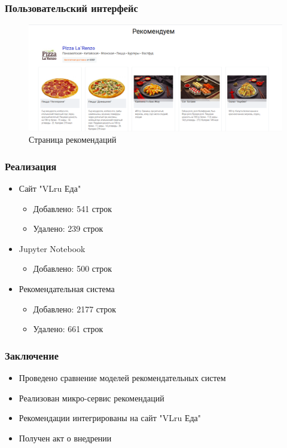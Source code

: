 \documentclass[10pt, unicode]{beamer}
\begin{document}
\begin{frame}
  \frametitle{Пользовательский интерфейс}
  \begin{adjustwidth}{-3em}{-1.5em}
    \begin{figure}[H]
      \centering
      \includegraphics[scale=0.34]{images/tag_page.png}
      \caption{Страница рекомендаций}
    \end{figure}
  \end{adjustwidth}
\end{frame}

\begin{frame}
  \frametitle{Реализация}
  \begin{itemize}
    \item Сайт "VLru Еда"
      \begin{itemize}
        \item Добавлено: 541 строк
        \item Удалено: 239 строк
      \end{itemize}
    \item Jupyter Notebook
      \begin{itemize}
        \item Добавлено: 500 строк
      \end{itemize}
    \item Рекомендательная система
      \begin{itemize}
        \item Добавлено: 2177 строк
        \item Удалено: 661 строк
      \end{itemize}
  \end{itemize}
\end{frame}

\begin{frame}
  \frametitle{Заключение}
  \begin{itemize}
    \item Проведено сравнение моделей рекомендательных систем
    \item Реализован микро-сервис рекомендаций
    \item Рекомендации интегрированы на сайт "VLru Еда"
    \item Получен акт о внедрении
  \end{itemize}
\end{frame}
\end{document}
